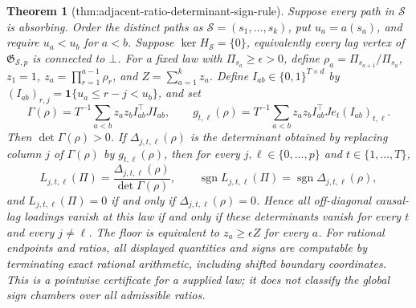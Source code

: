 \documentclass{article}
\newtheorem{theorem}{Theorem}
\begin{document}
\begin{theorem}[thm:adjacent-ratio-determinant-sign-rule]\label{thm:adjacent-ratio-determinant-sign-rule}
Suppose every path in \(\mathcal S\) is absorbing.  Order the distinct paths as \(\mathcal S=(s_1,\ldots,s_k)\), put \(u_a=a(s_a)\), and require \(u_a<u_b\) for \(a<b\).  Suppose \(\ker H_{\mathcal S}=\{0\}\), equivalently every lag vertex of \(\mathfrak G_{\mathcal S,p}\) is connected to \(\bot\).  For a fixed law with \(\Pi_{s_a}\geq\epsilon>0\), define \(\rho_a=\Pi_{s_{a+1}}/\Pi_{s_a}\), \(z_1=1\), \(z_a=\prod_{r=1}^{a-1}\rho_r\), and \(Z=\sum_{a=1}^{k}z_a\).  Define \(I_{ab}\in\{0,1\}^{T\times d}\) by \((I_{ab})_{r,j}=\mathbf 1\{u_a\leq r-j<u_b\}\), and set
\[
 \Gamma(\rho)=T^{-1}\sum_{a<b}z_az_bI_{ab}^{\top}JI_{ab},
 \qquad
 g_{t,\ell}(\rho)=T^{-1}\sum_{a<b}z_az_bI_{ab}^{\top}Je_t(I_{ab})_{t,\ell}.
\]
Then \(\det\Gamma(\rho)>0\).  If \(\Delta_{j,t,\ell}(\rho)\) is the determinant obtained by replacing column \(j\) of \(\Gamma(\rho)\) by \(g_{t,\ell}(\rho)\), then for every \(j,\ell\in\{0,\ldots,p\}\) and \(t\in\{1,\ldots,T\}\),
\[
 L_{j,t,\ell}(\Pi)=\frac{\Delta_{j,t,\ell}(\rho)}{\det\Gamma(\rho)},
 \qquad
 \operatorname{sgn}L_{j,t,\ell}(\Pi)=\operatorname{sgn}\Delta_{j,t,\ell}(\rho),
\]
and \(L_{j,t,\ell}(\Pi)=0\) if and only if \(\Delta_{j,t,\ell}(\rho)=0\).  Hence all off-diagonal causal-lag loadings vanish at this law if and only if these determinants vanish for every \(t\) and every \(j\neq\ell\).  The floor is equivalent to \(z_a\geq\epsilon Z\) for every \(a\).  For rational endpoints and ratios, all displayed quantities and signs are computable by terminating exact rational arithmetic, including shifted boundary coordinates.  This is a pointwise certificate for a supplied law; it does not classify the global sign chambers over all admissible ratios.
\end{theorem}
\end{document}
